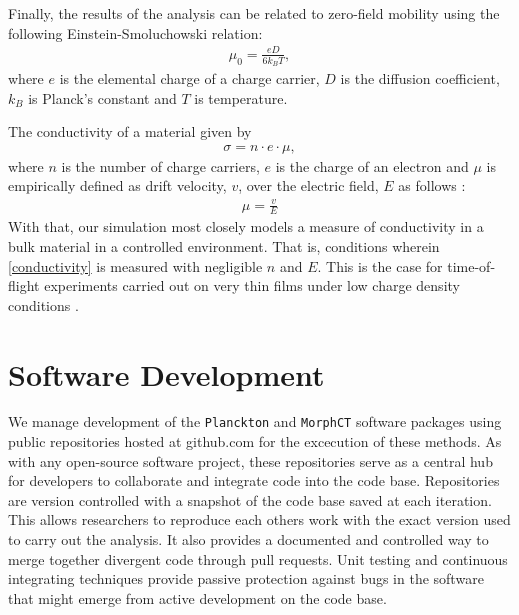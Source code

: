 Finally, the results of the  analysis can be related to  zero-field mobility using the following Einstein-Smoluchowski relation:
\begin{align}
    \label{einstein}
    \mu_{0} = \frac{eD}{6k_{B}T},
\end{align}
where $e$ is the elemental charge of a charge carrier, $D$ is the diffusion coefficient, $k_{B}$ is Planck's
constant and $T$ is temperature. 

The conductivity of a material given by 
\begin{align}
    \label{conductivity}
    \sigma = n \cdot e \cdot \mu,
\end{align}
where $n$ is the number of charge carriers, $e$ is the charge of an electron and $\mu$ is empirically
defined as drift velocity, $v$, over the electric field, $E$ as follows \cite{Kokil2012}:
\begin{align}
    \label{m}
    \mu = \frac{v}{E}
\end{align}
With that, our  simulation most closely models a measure of conductivity in a bulk material in a controlled
environment. That is, conditions wherein \autoref{conductivity} is measured with negligible $n$ and $E$.
This is the case for time-of-flight experiments carried out on very thin films under low charge density
conditions \cite{Chen2000a}.

\section{Software Development}

\label{software-methods}

We manage development of the \texttt{Planckton} and \texttt{MorphCT} software packages using public repositories hosted at
github.com\cite{cmelab} for the excecution of these methods.
As with any open-source software project, these repositories serve as a
central hub for developers to collaborate and integrate code into the code base. Repositories are
version controlled with a snapshot of the code base saved at each iteration. This allows researchers to 
reproduce each others work with the exact version used to carry out the analysis. It also provides a
documented and controlled way to merge together divergent code through pull requests. Unit testing and
continuous integrating techniques provide passive protection against bugs in the software that might emerge
from active development on the code base. 

